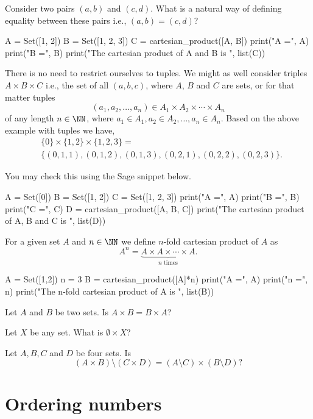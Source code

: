 \documentclass{article}
\begin{document}
\beginshex
Consider two pairs $(a, b)$ and $(c, d)$. What is a natural way of defining
equality between these pairs i.e., $(a, b) = (c, d)$?
\endshex


\begin{sage}
A = Set([1, 2])
B = Set([1, 2, 3])
C = cartesian_product([A, B])
print("A =", A)
print("B =", B)
print("The cartesian product of A and B is ", list(C))
\end{sage}

There is no need to restrict ourselves to tuples. We might as well
consider triples $A\times B\times C$ i.e., 
the set of all $(a, b, c)$, where $A$, $B$ and $C$ are sets, or
for that matter tuples
$$
(a_1, a_2, \dots, a_n)\in A_1\times A_2\times \cdots \times A_n
$$
of any length $n\in \NN$, where $a_1\in A_1, a_2\in A_2, 
\dots, a_n\in A_n$. Based on the above example with tuples we have,
\begin{align*}
&\{0\}\times\{1, 2\}\times \{1, 2, 3\} = \\
&\{(0, 1, 1), (0, 1, 2), (0, 1, 3), (0, 2, 1), (0, 2, 2), (0, 2, 3)\}.
\end{align*}

You may check this using the Sage snippet below.

\begin{code}
A = Set([0])
B = Set([1, 2])
C = Set([1, 2, 3])
print("A =", A)
print("B =", B)
print("C =", C)
D = cartesian_product([A, B, C])
print("The cartesian product of A, B and C is ", list(D))
\end{code}


For a given set $A$ and $n\in \NN$ we define $n$-fold cartesian product of $A$ as
$$
A^n = \underbrace{A\times A\times \cdots \times A}_{n\text{ times}}.
$$
\begin{code}
A = Set([1,2])
n = 3
B = cartesian_product([A]*n)
print("A =", A)
print("n =", n)
print("The n-fold cartesian product of A is ", list(B))
\end{code}

\beginshex
Let $A$ and $B$ be two sets. Is $A\times B = B \times A$?

Let $X$ be any set. What is $\emptyset \times X$?

Let $A, B, C$ and $D$ be four sets. Is
$$
(A\times B)\setminus (C\times D) = (A\setminus C)\times (B\setminus D)?
$$
\endshex



\section{Ordering numbers}
\end{document}
